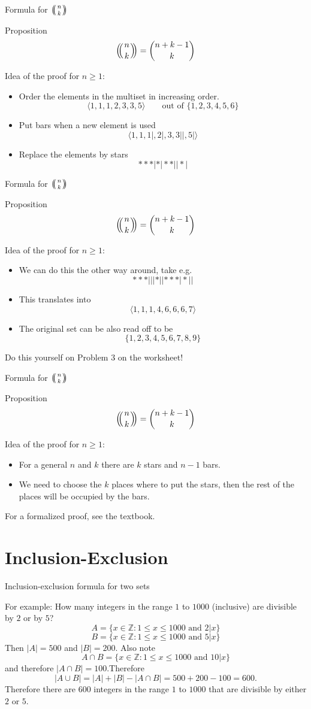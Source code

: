 \documentclass{beamer}
\def\multiset#1#2{\ensuremath{\left(\kern-.3em\left(\genfrac{}{}{0pt}{}{#1}{#2}\right)\kern-.3em\right)}}
\def\bl[#1]#2{\begin{block}{#1}#2\end{block}}
\def\itemb{\begin{itemize}}
\def\iteme{\end{itemize}}
\begin{document}
\begin{frame}{Formula for $\multiset{n}{k}$}
\bl[Proposition]{
\[
\multiset{n}{k}=\binom{n+k-1}{k}
\]
}
Idea of the proof for $n\geq 1$:
\itemb
\item Order the elements in the multiset in increasing order.
\[
\langle 1,1,1,2,3,3,5\rangle\qquad\textrm{out of }\{1,2,3,4,5,6\}
\]
\item Put bars when a new element is used
\[
\langle 1,1,1|,2|,3,3||,5|\rangle
\]
\item Replace the elements by stars
\[
***|*|**||*|
\]
\iteme
\end{frame}

\begin{frame}{Formula for $\multiset{n}{k}$}
\bl[Proposition]{
\[
\multiset{n}{k}=\binom{n+k-1}{k}
\]
}
Idea of the proof for $n\geq 1$:
\itemb
\item We can do this the other way around, take e.g.
\[
***|||*||***|*||
\]
\item This translates into
\[
\langle 1,1,1,4,6,6,6,7\rangle
\]
\item The original set can be also read off to be 
\[
\{1,2,3,4,5,6,7,8,9\}
\]
\iteme
Do this yourself on Problem 3 on the worksheet!
\end{frame}

\begin{frame}{Formula for $\multiset{n}{k}$}
\bl[Proposition]{
\[
\multiset{n}{k}=\binom{n+k-1}{k}
\]
}
Idea of the proof for $n\geq 1$:
\itemb
\item For a general $n$ and $k$ there are $k$ stars and $n-1$ bars.
\item We need to choose the $k$ places where to put the stars, then the rest of the places will be occupied by the bars.
\iteme
For a formalized proof, see the textbook.
\end{frame}

\section{Inclusion-Exclusion}

\begin{frame}{Inclusion-exclusion formula for two sets}
\bl[]{}

For example: How many integers in the range $1$ to $1000$ (inclusive) are divisible by $2$ or by $5$?\pause
\[
A=\{x\in\mathbb{Z}: 1\leq x\leq 1000\textrm{ and }2|x\}
\]
\[
B=\{x\in\mathbb{Z}: 1\leq x\leq 1000\textrm{ and }5|x\}
\]\pause
Then $|A|=500$ and $|B|=200$. Also note
\[
A\cap B=\{x\in\mathbb{Z}: 1\leq x\leq 1000\textrm{ and }10|x\}
\]
and therefore $|A\cap B|=100$.\pause Therefore
\[
|A\cup B|=|A|+|B|-|A\cap B|=500+200-100=600.
\]\pause
Therefore there are $600$ integers in the range $1$ to $1000$ that are divisible by either $2$ or $5$.
\end{frame}
\end{document}
